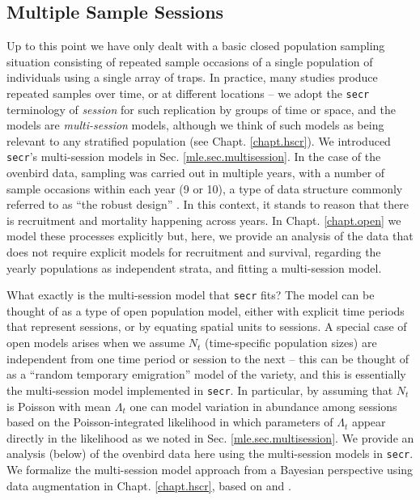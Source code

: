 \subsection{Multiple Sample Sessions}

Up to this point we have only dealt with a basic closed population
sampling situation consisting of repeated sample occasions of a single
population of individuals using a single array of traps. In practice,
many studies produce repeated samples over time, or at different
locations -- we adopt the \mbox{\tt secr} terminology of {\it session}
for such replication by groups of time or space, and the models are
{\it multi-session} models, although we think of such models as being
relevant to any stratified population (see Chapt. \ref{chapt.hscr}).
We introduced \mbox{\tt secr}'s
multi-session models in Sec. \ref{mle.sec.multisession}.  In the case
of the ovenbird data, sampling was carried out in multiple years, with
a number of sample occasions within each year (9 or 10), a type of
data structure commonly referred to as ``the robust
design'' \citep{pollock:1982}.  In this context,
it stands to reason that there is recruitment and mortality happening
across years. In Chapt. \ref{chapt.open} we model these processes
explicitly but, here, we provide an analysis of the data that does not
require explicit models for recruitment and survival, regarding the
yearly populations as independent strata, and fitting a multi-session
model.

What exactly is the multi-session model that \mbox{\tt secr} fits? The
model can be thought of as a type of open population model, either
with explicit time periods that represent sessions, or by equating
spatial units to sessions.  A special case of open models arises when
we assume $N_{t}$ (time-specific population sizes) are independent
from one time period or session to the next -- this can be thought of
as a ``random temporary emigration'' model of the
\citet{kendall_etal:1997} variety, and this is essentially the
multi-session model implemented in \mbox{\tt secr}.  In particular, by
assuming that $N_{t}$ is Poisson with mean $\Lambda_{t}$ one can model
variation in abundance among sessions based on the Poisson-integrated
likelihood in which parameters of $\Lambda_{t}$ appear directly in the
likelihood as we noted in Sec. \ref{mle.sec.multisession}.  We provide
an analysis (below) of the ovenbird data here using the multi-session
models in \mbox{\tt secr}.  We formalize the multi-session model
approach from a Bayesian perspective using data augmentation in
Chapt. \ref{chapt.hscr}, based on \citet{converse_royle:2012} and
\citet{royle_converse:2013}.


